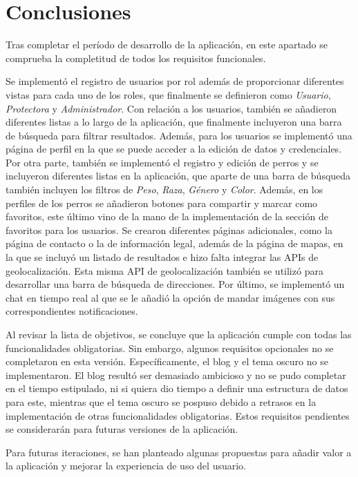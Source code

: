 \documentclass[a4paper, 12pt]{article}
\begin{document}
\newpage
\section{Conclusiones}

Tras completar el período de desarrollo de la aplicación, en este apartado se comprueba la completitud de todos los requisitos funcionales. 

Se implementó el registro de usuarios por rol además de proporcionar diferentes vistas para cada uno de los roles, que finalmente se definieron como \textit{Usuario},  \textit{Protectora}  y   \textit{Administrador}.  Con relación a los usuarios, también se añadieron diferentes listas a lo largo de la aplicación, que finalmente incluyeron una barra de búsqueda para filtrar resultados. Además, para los usuarios se implementó una página de perfil en la que se puede acceder a la edición de datos y credenciales. Por otra parte, también se implementó el registro y edición de perros y se incluyeron diferentes listas en la aplicación, que aparte de una barra de búsqueda también incluyen los filtros de  \textit{Peso},  \textit{Raza},  \textit{Género} y  \textit{Color}. Además, en los perfiles de los perros se añadieron botones para compartir y marcar como favoritos, este último vino de la mano de la implementación de la sección de favoritos para los usuarios. Se crearon diferentes páginas adicionales, como la página de contacto o la de información legal, además de la página de mapas, en la que se incluyó un listado de resultados e hizo falta integrar las APIs de geolocalización. Esta misma API de geolocalización también se utilizó para desarrollar una barra de búsqueda de direcciones. Por último, se implementó un chat en tiempo real al que se le añadió la opción de mandar imágenes con sus correspondientes notificaciones.

Al revisar la lista de objetivos, se concluye que la aplicación cumple con todas las funcionalidades obligatorias. Sin embargo, algunos requisitos opcionales no se completaron en esta versión. Específicamente, el blog y el tema oscuro no se implementaron. El blog resultó ser demasiado ambicioso y no se pudo completar en el tiempo estipulado, ni si quiera dio tiempo a definir una estructura de datos para este, mientras que el tema oscuro se pospuso debido a retrasos en la implementación de otras funcionalidades obligatorias. Estos requisitos pendientes se considerarán para futuras versiones de la aplicación.

Para futuras iteraciones, se han planteado algunas propuestas para añadir valor a la aplicación y mejorar la experiencia de uso del usuario.
\end{document}
